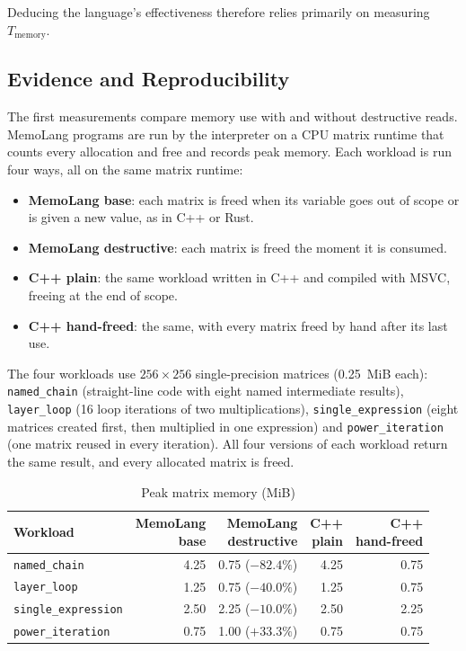 \documentclass[a4paper]{article}
\begin{document}
	Deducing the language's effectiveness therefore relies primarily on measuring $T_{\mathrm{memory}}$.
	
	
	
	
	\subsection{Evidence and Reproducibility}
	\label{sec:evidence}
	
	The first measurements compare memory use with and without destructive reads. MemoLang programs are run by the interpreter on a CPU matrix runtime that counts every allocation and free and records peak memory. Each workload is run four ways, all on the same matrix runtime:
	\begin{itemize}
		\item \textbf{MemoLang base}: each matrix is freed when its variable goes out of scope or is given a new value, as in C++ or Rust.
		\item \textbf{MemoLang destructive}: each matrix is freed the moment it is consumed.
		\item \textbf{C++ plain}: the same workload written in C++ and compiled with MSVC, freeing at the end of scope.
		\item \textbf{C++ hand-freed}: the same, with every matrix freed by hand after its last use.
	\end{itemize}
	The four workloads use $256 \times 256$ single-precision matrices (0.25~MiB each): \texttt{named\_chain} (straight-line code with eight named intermediate results), \texttt{layer\_loop} (16 loop iterations of two multiplications), \texttt{single\_expression} (eight matrices created first, then multiplied in one expression) and \texttt{power\_iteration} (one matrix reused in every iteration). All four versions of each workload return the same result, and every allocated matrix is freed.

	\begin{table}[h]
		\centering
		\caption{Peak matrix memory (MiB)}
		\label{tab:results}
		\small
		\begin{tabular}{@{}lrrrr@{}}
			\toprule
			Workload & \shortstack[r]{MemoLang\\base} & \shortstack[r]{MemoLang\\destructive} & \shortstack[r]{C++\\plain} & \shortstack[r]{C++\\hand-freed} \\
			\midrule
			\texttt{named\_chain} & 4.25 & 0.75 ($-82.4\%$) & 4.25 & 0.75 \\
			\texttt{layer\_loop} & 1.25 & 0.75 ($-40.0\%$) & 1.25 & 0.75 \\
			\texttt{single\_expression} & 2.50 & 2.25 ($-10.0\%$) & 2.50 & 2.25 \\
			\texttt{power\_iteration} & 0.75 & 1.00 ($+33.3\%$) & 0.75 & 0.75 \\
			\bottomrule
		\end{tabular}
	\end{table}
\end{document}
